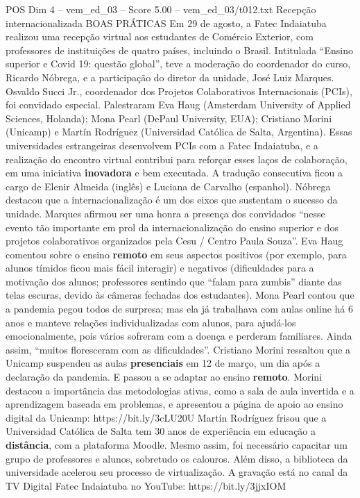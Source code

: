 \begin{textsample}{POS Dim 4 – vem\_ed\_03 – Score 5.00 – vem\_ed\_03/t012.txt}  \label{ex:f4_pos_049}
Recepção internacionalizada BOAS PRÁTICAS Em 29 de agosto, a Fatec Indaiatuba realizou uma recepção virtual aos estudantes de Comércio Exterior, com professores de instituições de quatro países, incluindo o Brasil.
Intitulada “Ensino superior e Covid 19: questão global”, teve a moderação do coordenador do curso, Ricardo Nóbrega, e a participação do diretor da unidade, José Luiz Marques.
Osvaldo Succi Jr., coordenador dos Projetos Colaborativos Internacionais (PCIs), foi convidado especial.
Palestraram Eva Haug (Amsterdam University of Applied Sciences, Holanda); Mona Pearl (DePaul University, EUA); Cristiano Morini (Unicamp) e Martín Rodríguez (Universidad Católica de Salta, Argentina).
Essas universidades estrangeiras desenvolvem PCIs com a Fatec Indaiatuba, e a realização do encontro virtual contribui para reforçar esses laços de colaboração, em uma iniciativa \textbf{inovadora} e bem executada.
A tradução consecutiva ficou a cargo de Elenir Almeida (inglês) e Luciana de Carvalho (espanhol).
Nóbrega destacou que a internacionalização é um dos eixos que sustentam o sucesso da unidade.
Marques afirmou ser uma honra a presença dos convidados “nesse evento tão importante em prol da internacionalização do ensino superior e dos projetos colaborativos organizados pela Cesu / Centro Paula Souza”.
Eva Haug comentou sobre o ensino \textbf{remoto} em seus aspectos positivos (por exemplo, para alunos tímidos ficou mais fácil interagir) e negativos (dificuldades para a motivação dos alunos; professores sentindo que “falam para zumbis” diante das telas escuras, devido às câmeras fechadas dos estudantes).
Mona Pearl contou que a pandemia pegou todos de surpresa; mas ela já trabalhava com aulas online há 6 anos e manteve relações individualizadas com alunos, para ajudá-los emocionalmente, pois vários sofreram com a doença e perderam familiares.
Ainda assim, “muitos floresceram com as dificuldades”.
Cristiano Morini ressaltou que a Unicamp suspendeu as aulas \textbf{presenciais} em 12 de março, um dia após a declaração da pandemia.
E passou a se adaptar ao ensino \textbf{remoto}.
Morini destacou a importância das metodologias ativas, como a sala de aula invertida e a aprendizagem baseada em problemas, e apresentou a página de apoio ao ensino digital da Unicamp: https://bit.ly/3cLU20U Martín Rodríguez frisou que a Universidad Católica de Salta tem 30 anos de experiência em educação a \textbf{distância}, com a plataforma Moodle.
Mesmo assim, foi necessário capacitar um grupo de professores e alunos, sobretudo os calouros.
Além disso, a biblioteca da universidade acelerou seu processo de virtualização.
A gravação está no canal da TV Digital Fatec Indaiatuba no YouTube: https://bit.ly/3jjxIOM

\end{textsample}
